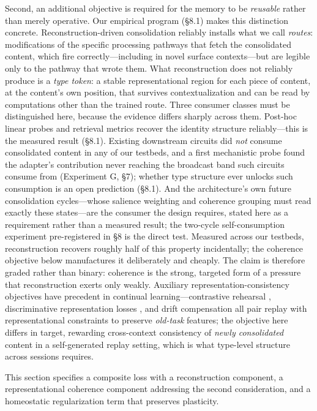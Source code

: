 \documentclass[11pt]{article}
\begin{document}
Second, an additional objective is required for the memory to be \emph{reusable} rather than merely operative. Our empirical program (\S 8.1) makes this distinction concrete. Reconstruction-driven consolidation reliably installs what we call \emph{routes}: modifications of the specific processing pathways that fetch the consolidated content, which fire correctly---including in novel surface contexts---but are legible only to the pathway that wrote them. What reconstruction does not reliably produce is a \emph{type token}: a stable representational region for each piece of content, at the content's own position, that survives contextualization and can be read by computations other than the trained route. Three consumer classes must be distinguished here, because the evidence differs sharply across them. Post-hoc linear probes and retrieval metrics recover the identity structure reliably---this is the measured result (\S 8.1). Existing downstream circuits did \emph{not} consume consolidated content in any of our testbeds, and a first mechanistic probe found the adapter's contribution never reaching the broadcast band such circuits consume from (Experiment G, \S 7); whether type structure ever unlocks such consumption is an open prediction (\S 8.1). And the architecture's own future consolidation cycles---whose salience weighting and coherence grouping must read exactly these states---are the consumer the design requires, stated here as a requirement rather than a measured result; the two-cycle self-consumption experiment pre-registered in \S 8 is the direct test. Measured across our testbeds, reconstruction recovers roughly half of this property incidentally; the coherence objective below manufactures it deliberately and cheaply. The claim is therefore graded rather than binary: coherence is the strong, targeted form of a pressure that reconstruction exerts only weakly. Auxiliary representation-consistency objectives have precedent in continual learning---contrastive rehearsal \cite{cha2021}, discriminative representation losses \cite{chen2020sdrl}, and drift compensation \cite{gomezvilla2024} all pair replay with representational constraints to preserve \emph{old-task} features; the objective here differs in target, rewarding cross-context consistency of \emph{newly consolidated} content in a self-generated replay setting, which is what type-level structure across sessions requires.

This section specifies a composite loss with a reconstruction component, a representational coherence component addressing the second consideration, and a homeostatic regularization term that preserves plasticity.
\end{document}
